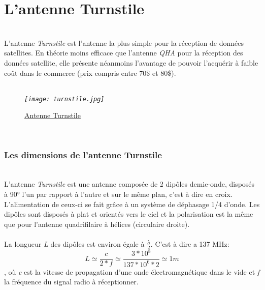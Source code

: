 \documentclass[12pt,fleqn]{book} %
\begin{document}
\section{L'antenne Turnstile}
~\\\indent L'antenne \emph{Turnstile} est l'antenne la plus simple pour la réception de données satellites. En théorie moins efficace que l'antenne \emph{QHA} pour la réception des données satellite, elle présente néanmoins l'avantage de pouvoir l'acquérir à faible coût dans le commerce (prix compris entre 70\$ et 80\$).
~\\\\
\begin{figure}[H]
	\centering
	\itshape
	\texttt{[image: turnstile.jpg]}
	\caption{\label{turnstile} \underline{Antenne Turnstile}}
\end{figure}
~\\
\subsubsection{Les dimensions de l'antenne Turnstile}
~\\L'antenne \emph{Turnstile} est une antenne composée de 2 dipôles demie-onde, disposés à 90° l'un par rapport à l'autre et sur le même plan, c'est à dire en croix. L'alimentation de ceux-ci se fait grâce à un système de déphasage 1/4 d'onde. Les dipôles sont disposés à plat et orientés vers le ciel et la polarisation est la même que pour l'antenne quadrifilaire à hélices (circulaire droite).
~\\\\La longueur \emph{L} des dipôles est environ égale à \(\frac{\lambda}{2}\). C'est à dire a 137 MHz:
$$ L\simeq\frac{c}{2*f}\simeq \frac{3*10^8}{137*10^6*2}\simeq1 m$$, où \emph{c} est la vitesse de propagation d'une onde électromagnétique dans le vide et \emph{f} la fréquence du signal radio à réceptionner.
~\\\\
\end{document}
